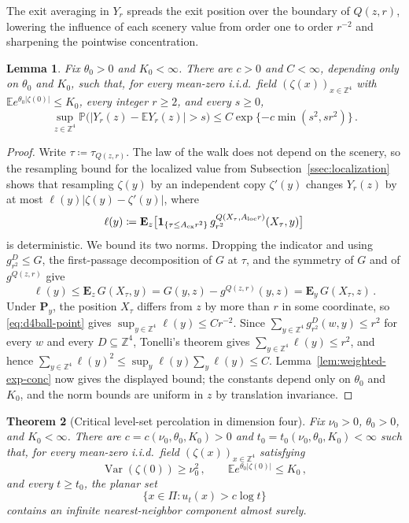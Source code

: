 \documentclass[11pt]{amsart}
\theoremstyle{plain}
\newtheorem{theorem}{Theorem}[section]
\newtheorem{lemma}[theorem]{Lemma}
\theoremstyle{definition}
\newcommand{\Z}{\mathbb{Z}}
\newcommand{\E}{\mathbb{E}}
\renewcommand{\P}{\mathbb{P}}
\DeclareMathOperator{\Var}{Var}
\newcommand{\one}{\mathbf{1}}
\begin{document}
The exit averaging in $Y_r$ spreads the exit position over the boundary of
$Q(z,r)$, lowering the influence of each scenery value from order one to order $r^{-2}$
and sharpening the pointwise concentration.

\begin{lemma}\label{lem:d4-exit-average-concentration}
Fix $\theta_{0}>0$ and $K_{0}<\infty$. There are $c>0$ and $C<\infty$, depending
only on $\theta_{0}$ and $K_{0}$, such that, for every mean-zero i.i.d.\ field
$(\zeta(x))_{x\in\Z^4}$ with $\E e^{\theta_{0}|\zeta(0)|}\leq K_{0}$, every integer
$r\geq2$, and every $s\geq0$,
\[
    \sup_{z\in\Z^4}
    \P\bigl(|Y_r(z)-\E Y_r(z)|>s\bigr)
    \leq
    C\exp\{-c\min(s^2,sr^2)\}\, .
\]
\end{lemma}
\begin{proof}
Write $\tau\coloneqq\tau_{Q(z,r)}$. The law of the walk does not depend on the
scenery, so the resampling bound for the localized value from
Subsection~\ref{ssec:localization} shows that resampling $\zeta(y)$ by an
independent copy $\zeta'(y)$ changes $Y_r(z)$ by at most
$\ell(y)|\zeta(y)-\zeta'(y)|$, where
\[
    \ell(y)\coloneqq
    \mathbf E_z\bigl[
    \one_{\{\tau\leq A_{\rm ex}r^2\}}\,
    g_{r^2}^{Q(X_\tau,A_{\rm loc}r)}(X_\tau,y)
    \bigr]
\]
is deterministic. We bound its two norms. Dropping the indicator and using
$g_{r^2}^{D}\leq G$, the first-passage decomposition of $G$ at $\tau$, and the
symmetry of $G$ and of $g^{Q(z,r)}$ give
\[
    \ell(y)
    \leq
    \mathbf E_z\,G(X_\tau,y)
    =
    G(y,z)-g^{Q(z,r)}(y,z)
    =
    \mathbf E_y\,G(X_\tau,z)\, .
\]
Under $\mathbf P_y$, the position $X_\tau$ differs from $z$ by more than $r$ in
some coordinate, so \eqref{eq:d4ball-point} gives
$\sup_{y\in\Z^4}\ell(y)\leq Cr^{-2}$. Since
$\sum_{y\in\Z^4}g_{r^2}^{D}(w,y)\leq r^2$ for every $w$ and every
$D\subseteq\Z^4$, Tonelli's theorem gives
$\sum_{y\in\Z^4}\ell(y)\leq r^2$, and hence
$\sum_{y\in\Z^4}\ell(y)^2\leq\sup_{y}\ell(y)\sum_{y}\ell(y)\leq C$.
Lemma~\ref{lem:weighted-exp-conc} now gives the displayed bound; the constants
depend only on $\theta_{0}$ and $K_{0}$, and the norm bounds are uniform in $z$ by
translation invariance.
\end{proof}

\begin{theorem}[Critical level-set percolation in dimension four]
\label{thm:d4-critical-level-percolation}
Fix $\nu_{0}>0$, $\theta_{0}>0$, and $K_{0}<\infty$. There are
$c=c(\nu_{0},\theta_{0},K_{0})>0$ and
$t_0=t_0(\nu_{0},\theta_{0},K_{0})<\infty$ such that, for every mean-zero i.i.d.\
field $(\zeta(x))_{x\in\Z^4}$ satisfying
\[
    \Var(\zeta(0))\geq\nu_{0}^2\, ,
    \qquad
    \E e^{\theta_{0}|\zeta(0)|}\leq K_{0}\, ,
\]
and every $t\geq t_0$, the planar set
\[
    \{x\in\Pi:u_t(x)>c\log t\}
\]
contains an infinite nearest-neighbor component almost surely. 
\end{theorem}
\end{document}
